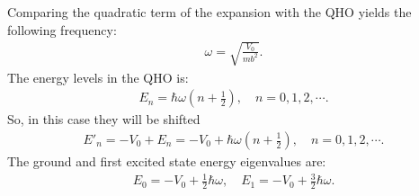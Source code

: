 \documentclass[letterpaper,11pt,twoside]{article}
\begin{document}
  Comparing the quadratic term of the expansion with the QHO yields the following frequency:
  \begin{align*}
    \omega=\sqrt{\frac{V_0}{mb^2}}.
  \end{align*}
  The energy levels in the QHO is:
  \begin{align*}
    E_n=\hbar\omega\left(n+\frac{1}{2}\right),\quad n=0,1,2,\cdots.
  \end{align*}
  So, in this case they will be shifted
  \begin{align*}
    E'_n=-V_0+E_n=-V_0+\hbar\omega\left(n+\frac{1}{2}\right),\quad n=0,1,2,\cdots.
  \end{align*}
  The ground and first excited state energy eigenvalues are:
  \begin{align*}
    E_0=-V_0+\frac{1}{2}\hbar\omega,\quad E_1=-V_0+\frac{3}{2}\hbar\omega.
  \end{align*}



%
\end{document}
